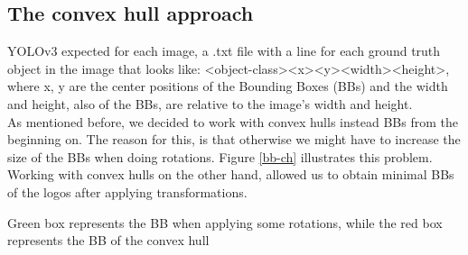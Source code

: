 \documentclass[a4paper]{article}
\begin{document}
\subsection{The convex hull approach}
YOLOv3 expected for each image, a .txt file with a line for each ground truth object in the image that looks like:
<object-class><x><y><width><height>, where x, y are the center positions of the Bounding Boxes (BBs) and the width and height, also of the BBs, are relative to the image's width and height. \\
As mentioned before, we decided to work with convex hulls instead BBs from the beginning on.  The reason for this, is that otherwise we might have to increase the size of the BBs when doing rotations. Figure \ref{bb-ch} illustrates this problem.   Working with convex hulls on the other hand,  allowed us to obtain minimal BBs of the logos after applying transformations.

\begin{minipage}{\columnwidth}
\makeatletter
\newcommand{\@captype}{figure}
\makeatother
\centering
\captionsetup[subfigure]{labelformat=empty}
\caption{Green box represents the BB when applying some rotations, while the red box represents the BB of the convex hull}
\label{bb-ch}
\end{minipage}
\end{document}
